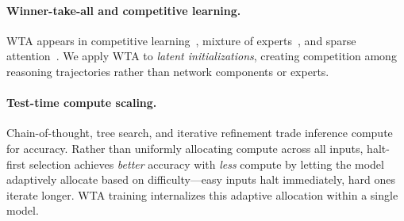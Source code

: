 
\paragraph{Winner-take-all and competitive learning.}
WTA appears in competitive learning~\citep{rumelhart1985competitive}, mixture of
experts~\citep{shazeer2017moe}, and sparse attention~\citep{child2019sparse}. We
apply WTA to \emph{latent initializations}, creating competition among reasoning
trajectories rather than network components or experts.


\paragraph{Test-time compute scaling.}
Chain-of-thought, tree search, and iterative refinement trade inference compute
for accuracy. Rather than uniformly allocating compute across all inputs,
halt-first selection achieves \emph{better} accuracy with \emph{less} compute
by letting the model adaptively allocate based on difficulty---easy inputs halt
immediately, hard ones iterate longer. WTA training internalizes this adaptive
allocation within a single model.

